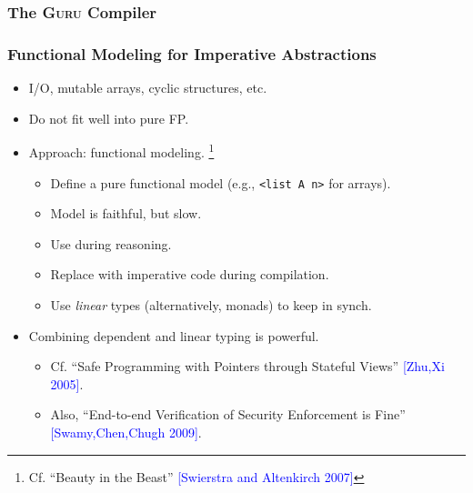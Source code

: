 \documentclass[10pt]{beamer}
\begin{document}
\begin{frame}
\frametitle{The \textsc{Guru} Compiler}
\begin{center}
\end{center}
\end{frame}

\begin{frame}
\frametitle{Functional Modeling for Imperative Abstractions}

\begin{itemize}
\item I/O, mutable arrays, cyclic structures, etc.
\item Do not fit well into pure FP.
\item Approach: functional modeling. \footnote{Cf. ``Beauty in the Beast'' \textcolor{blue}{[Swierstra and Altenkirch 2007]}}
\begin{itemize}
\item Define a pure functional model (e.g., \texttt{<list A n>} for arrays).
\item Model is faithful, but slow.
\item Use during reasoning.
\item Replace with imperative code during compilation.
\item Use \emph{linear} types (alternatively, monads) to keep in synch.
\end{itemize}
\item Combining dependent and linear typing is powerful.
\begin{itemize}
\item Cf. ``Safe Programming with Pointers through Stateful Views'' \textcolor{blue}{[Zhu,Xi 2005]}.
\item Also, ``End-to-end Verification of Security Enforcement is Fine'' \textcolor{blue}{[Swamy,Chen,Chugh 2009]}.
\end{itemize}
\end{itemize}
\end{frame}
\end{document}
